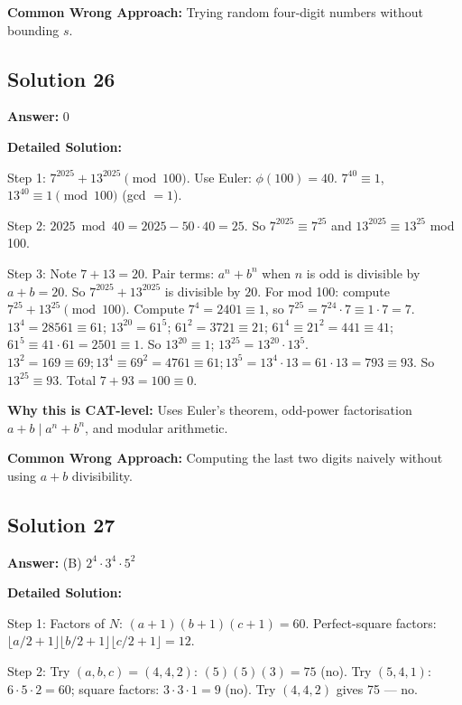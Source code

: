 \documentclass[11pt]{article}
\begin{document}
\textbf{Common Wrong Approach:} Trying random four-digit numbers without bounding \(s\).

\subsection*{Solution 26}
\textbf{Answer:} 0

\textbf{Detailed Solution:}

Step 1: \(7^{2025} + 13^{2025} \pmod{100}\). Use Euler: \(\phi(100)=40\). \(7^{40}\equiv 1\), \(13^{40}\equiv 1 \pmod{100}\) (gcd \(=1\)).

Step 2: \(2025 \bmod 40 = 2025 - 50 \cdot 40 = 25\). So \(7^{2025}\equiv 7^{25}\) and \(13^{2025}\equiv 13^{25}\) mod 100.

Step 3: Note \(7 + 13 = 20\). Pair terms: \(a^{n} + b^{n}\) when \(n\) is odd is divisible by \(a+b=20\). So \(7^{2025}+13^{2025}\) is divisible by \(20\). For mod 100: compute \(7^{25}+13^{25} \pmod{100}\). Compute \(7^4 = 2401 \equiv 1\), so \(7^{25} = 7^{24}\cdot 7 \equiv 1 \cdot 7 = 7\). \(13^4 = 28561 \equiv 61\); \(13^{20} = 61^5\); \(61^2 = 3721 \equiv 21\); \(61^4 \equiv 21^2 = 441 \equiv 41\); \(61^5 \equiv 41 \cdot 61 = 2501 \equiv 1\). So \(13^{20}\equiv 1\); \(13^{25}=13^{20}\cdot 13^5\). \(13^2=169\equiv 69; 13^4\equiv 69^2=4761\equiv 61; 13^5=13^4\cdot 13 = 61\cdot 13=793\equiv 93\). So \(13^{25}\equiv 93\). Total \(7+93=100 \equiv 0\).

\textbf{Why this is CAT-level:} Uses Euler's theorem, odd-power factorisation \(a+b\mid a^n+b^n\), and modular arithmetic.

\textbf{Common Wrong Approach:} Computing the last two digits naively without using \(a+b\) divisibility.

\subsection*{Solution 27}
\textbf{Answer:} (B) \(2^4 \cdot 3^4 \cdot 5^2\)

\textbf{Detailed Solution:}

Step 1: Factors of \(N\): \((a+1)(b+1)(c+1)=60\). Perfect-square factors: \(\lfloor a/2 + 1\rfloor \lfloor b/2 + 1\rfloor \lfloor c/2 + 1\rfloor = 12\).

Step 2: Try \((a,b,c)=(4,4,2)\): \((5)(5)(3)=75\) (no). Try \((5,4,1)\): \(6\cdot 5\cdot 2=60\); square factors: \(3 \cdot 3 \cdot 1=9\) (no). Try \((4,4,2)\) gives 75 — no.
\end{document}
